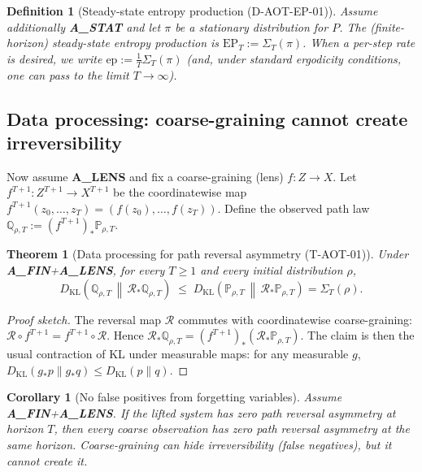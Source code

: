 \documentclass[11pt]{article}
\newtheorem{definition}{Definition}
\newtheorem{theorem}{Theorem}
\newtheorem{corollary}{Corollary}
\theoremstyle{remark}
\begin{document}
\begin{definition}[Steady-state entropy production (D-AOT-EP-01)]
Assume additionally \textbf{A\_STAT} and let $\pi$ be a stationary distribution for $P$.
The (finite-horizon) steady-state entropy production is $\mathrm{EP}_T:=\Sigma_T(\pi)$.
When a per-step rate is desired, we write $\mathrm{ep}:=\tfrac1T\Sigma_T(\pi)$ (and, under standard ergodicity conditions, one can pass to the limit $T\to\infty$).
\end{definition}

\subsection{Data processing: coarse-graining cannot create irreversibility}

Now assume \textbf{A\_LENS} and fix a coarse-graining (lens) $f:Z\to X$.
Let $f^{T+1}:Z^{T+1}\to X^{T+1}$ be the coordinatewise map $f^{T+1}(z_0,\dots,z_T)=(f(z_0),\dots,f(z_T))$.
Define the observed path law $\mathbb Q_{\rho,T}:=(f^{T+1})_*\mathbb P_{\rho,T}$.

\begin{theorem}[Data processing for path reversal asymmetry (T-AOT-01)]\label{thm:dpi_path}
Under \textbf{A\_FIN}+\textbf{A\_LENS}, for every $T\ge 1$ and every initial distribution $\rho$,
\[
D_{\mathrm{KL}}\!\left(\mathbb Q_{\rho,T}\,\middle\|\,\mathcal R_*\mathbb Q_{\rho,T}\right)
\;\le\;
D_{\mathrm{KL}}\!\left(\mathbb P_{\rho,T}\,\middle\|\,\mathcal R_*\mathbb P_{\rho,T}\right)
=\Sigma_T(\rho).
\]
\end{theorem}

\begin{proof}[Proof sketch]
The reversal map $\mathcal R$ commutes with coordinatewise coarse-graining: $\mathcal R\circ f^{T+1}=f^{T+1}\circ \mathcal R$.
Hence $\mathcal R_*\mathbb Q_{\rho,T}=(f^{T+1})_*(\mathcal R_*\mathbb P_{\rho,T})$.
The claim is then the usual contraction of KL under measurable maps: for any measurable $g$, $D_{\mathrm{KL}}(g_*p\|g_*q)\le D_{\mathrm{KL}}(p\|q)$.
\end{proof}

\begin{corollary}[No false positives from forgetting variables]
Assume \textbf{A\_FIN}+\textbf{A\_LENS}.
If the lifted system has zero path reversal asymmetry at horizon $T$, then every coarse observation has zero path reversal asymmetry at the same horizon.
Coarse-graining can hide irreversibility (false negatives), but it cannot create it.
\end{corollary}
\end{document}
